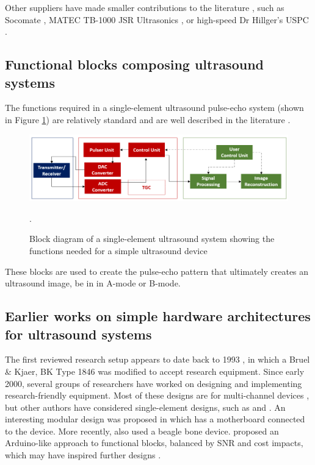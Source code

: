 \documentclass{article}
\begin{document}
Other suppliers have made smaller contributions to the literature \cite{ozdemir_remote_2018}, such as Socomate \cite{gil-alba_morphological_2019}, MATEC TB-1000 \cite{kielczynski_thermophysical_2017} JSR Ultrasonics \cite{cramer_ultrasonic_2015}, or high-speed Dr Hillger's USPC \cite{hillger_high_2016}. 


\subsection{Functional blocks composing ultrasound systems}

The functions required in a single-element ultrasound pulse-echo system (shown in Figure \ref{fig:BlockDiagramme}) are relatively standard and are well described in the literature \cite{murtaza_ali_signal_2008}.

\begin{figure}[H]
 \includegraphics[width=\linewidth]{images/Blockdiagramme.PNG}
 \caption{Block diagram of a single-element ultrasound system showing the functions needed for a simple ultrasound device}.
 \label{fig:BlockDiagramme}
\end{figure}
These blocks are used to create the pulse-echo pattern that ultimately creates an ultrasound image, be in in A-mode or B-mode.


\subsection{Earlier works on simple hardware architectures for ultrasound systems}

The first reviewed research setup appears to date back to 1993 \cite{jensen_deconvolution_1993}, in which a Bruel \& Kjaer, BK Type 1846 was modified to accept research equipment.
Since early 2000, several groups of researchers have worked on designing and implementing research-friendly equipment. Most of these designs are for multi-channel devices \cite{boni_ula-op_2016, boni_reconfigurable_2012, boni_ultrasound_2018, qiu_flexible_2012, levesque_architecture_2011}, but other authors have considered single-element designs, such as \cite{carotenuto_fast_2005} and \cite{richard_low-cost_2008}. An interesting modular design was proposed in \cite{wall_high-speed_2010} which has a motherboard connected to the device. More recently, \cite{taylor_development_2017} also used a beagle bone device. \cite{jonveaux_arduino-like_2017} proposed an Arduino-like approach to functional blocks, balanced by SNR and cost impacts, which may have inspired further designs \cite{golabek_construction_2019}.
\end{document}
